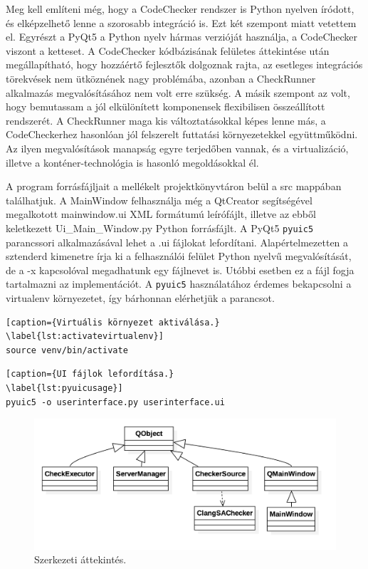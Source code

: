 \documentclass[a4paper,12pt]{report}
\begin{document}
Meg kell említeni még, hogy a CodeChecker rendszer is Python nyelven íródott, és elképzelhető lenne a szorosabb integráció is. Ezt két szempont miatt vetettem el. Egyrészt a PyQt5 a Python nyelv hármas verzióját használja, a CodeChecker viszont a ketteset. A CodeChecker kódbázisának felületes áttekintése után megállapítható, hogy hozzáértő fejlesztők dolgoznak rajta, az esetleges integrációs törekvések nem ütköznének nagy problémába, azonban a CheckRunner alkalmazás megvalósításához nem volt erre szükség. A másik szempont az volt, hogy bemutassam a jól elkülönített komponensek flexibilisen összeállított rendszerét. A CheckRunner maga kis változtatásokkal képes lenne más, a CodeCheckerhez hasonlóan jól felszerelt futtatási környezetekkel együttműködni. Az ilyen megvalósítások manapság egyre terjedőben vannak, és a virtualizáció, illetve a konténer-technológia is hasonló megoldásokkal él.

A program forrásfájljait a mellékelt projektkönyvtáron belül a src mappában találhatjuk. A MainWindow felhasználja még a QtCreator segítségével megalkotott mainwindow.ui XML formátumú leírófájlt, illetve az ebből keletkezett Ui\_Main\_Window.py Python forrásfájlt. A PyQt5 \texttt{pyuic5} parancssori alkalmazásával lehet a .ui fájlokat lefordítani. Alapértelmezetten a sztenderd kimenetre írja ki a felhasználói felület Python nyelvű megvalósítását, de a -x kapcsolóval megadhatunk egy fájlnevet is. Utóbbi esetben ez a fájl fogja tartalmazni az implementációt. A \texttt{pyuic5} használatához érdemes bekapcsolni a virtualenv környezetet, így bárhonnan elérhetjük a parancsot.

\begin{lstlisting}[caption={Virtuális környezet aktiválása.}
\label{lst:activatevirtualenv}]
source venv/bin/activate
\end{lstlisting}

\begin{lstlisting}[caption={UI fájlok lefordítása.}
\label{lst:pyuicusage}]
pyuic5 -o userinterface.py userinterface.ui
\end{lstlisting}

\begin{figure}[h]
\caption{Szerkezeti áttekintés.}
\centering
\includegraphics[scale=0.3]{UMLattekintes.png}
\end{figure}
\end{document}
